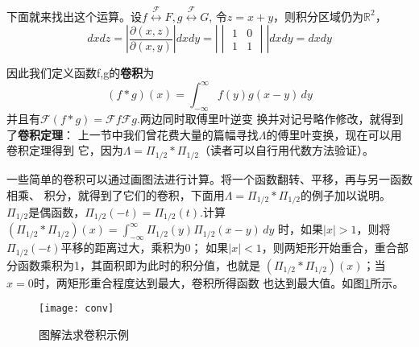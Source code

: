\documentclass{ctexbook}
\begin{document}
下面就来找出这个运算。设$f\overset{\mathcal{F} }{\longleftrightarrow}F,g\overset{\mathcal{F} }{\longleftrightarrow}G$,
令$z=x+y$，则积分区域仍为$\mathbb{R}^2$，
\[dxdz=\left|\frac{\partial(x,z)}{\partial(x,y)}\right|dxdy=\left|\begin{vmatrix}
        1 & 0 \\
        1 & 1
    \end{vmatrix}\right| dxdy=dxdy\]

因此我们定义函数f,g的\textbf{卷积}为
\begin{equation}
    (f*g)(x)=\int_{-\infty}^{\infty}f(y)g(x-y)\,dy
\end{equation}
并且有$\mathcal{F} (f*g)=\mathcal{F} f\mathcal{F} g$.两边同时取傅里叶逆变
换并对记号略作修改，就得到了\textbf{卷积定理}：
上一节中我们曾花费大量的篇幅寻找$\Lambda$的傅里叶变换，现在可以用卷积定理得到
它，因为$\Lambda=\Pi_{1/2}*\Pi_{1/2}$（读者可以自行用代数方法验证）。

一些简单的卷积可以通过画图法进行计算。将一个函数翻转、平移，再与另一函数相乘、
积分，就得到了它们的卷积，下面用$\Lambda=\Pi_{1/2}*\Pi_{1/2}$的例子加以说明。
$\Pi_{1/2}$是偶函数，$\Pi_{1/2}(-t)=\Pi_{1/2}(t)$.计算
$(\Pi_{1/2}*\Pi_{1/2})(x)=\int_{-\infty}^{\infty}\Pi_{1/2}(y)\Pi_{1/2}(x-y)\,dy$
时，如果$|x|>1$，则将$\Pi_{1/2}(-t)$平移的距离过大，乘积为0；
如果$|x|<1$，则两矩形开始重合，重合部分函数乘积为1，其面积即为此时的积分值，也就是
$(\Pi_{1/2}*\Pi_{1/2})(x)$；当$x=0$时，两矩形重合程度达到最大，卷积所得函数
也达到最大值。如图\ref{fig:conv}所示。
\begin{figure}
    \centering
    \texttt{[image: conv]}
    \caption{图解法求卷积示例}\label{fig:conv}
\end{figure}
\end{document}
